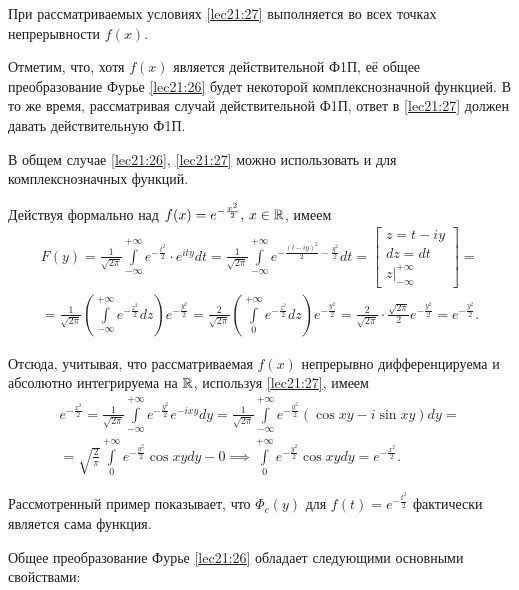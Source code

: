 \documentclass[../../main.tex]{subfiles}
\newcommand{\intii}{\int\limits_{-\infty}^{+\infty}}
\begin{document}
При  рассматриваемых условиях \eqref{lec21:27} выполняется во всех точках 
непрерывности $f(x)$.

Отметим, что, хотя $f(x)$ является действительной Ф1П, её общее преобразование 
Фурье \eqref{lec21:26} будет некоторой комплекснозначной функцией. В то же 
время, рассматривая случай действительной Ф1П, ответ в \eqref{lec21:27} 
должен давать действительную Ф1П.

В общем случае \eqref{lec21:26}, \eqref{lec21:27} можно использовать и для  
комплекснозначных функций.

\begin{example}
  Действуя формально над  $f(x) = e^{-\frac{x^2}2}, \, x \in \mathbb{R}$, имеем
  \begin{multline*}
    F(y) = \frac1{\sqrt{2\pi}}\intii e^{-\frac{t^2}2} \cdot e^{ity} dt = 
    \frac1{\sqrt{2\pi}}\intii e^{-\frac{(t-iy)^2}2-\frac{y^2}2} dt =
    \begin{bmatrix}
      z = t-iy \\
      dz = dt \\
      z \big|_{-\infty}^{+\infty}
    \end{bmatrix} =\\ =
    \frac1{\sqrt{2\pi}} \left(\intii e^{-\frac{z^2}2} dz\right)
    e^{-\frac{y^2}2} = \frac{2}{\sqrt{2\pi}}\left(\int\limits_{0}^{+\infty} 
    e^{-\frac{z^2}2} dz\right) e^{-\frac{y^2}2} = \frac{2}{\sqrt{2\pi}}\cdot
    \frac{\sqrt{2\pi}}{2}e^{-\frac{y^2}2} =  e^{-\frac{y^2}2}.
  \end{multline*}
  
  Отсюда, учитывая, что рассматриваемая $f(x)$ непрерывно дифференцируема и 
  абсолютно интегрируема на $\mathbb{R}$, используя \eqref{lec21:27}, имеем
  \begin{multline*}
    e^{-\frac{x^2}2} = \frac{1}{\sqrt{2\pi}}\intii e^{-\frac{y^2}2}e^{-ixy} dy 
    =\frac{1}{\sqrt{2\pi}}\intii e^{-\frac{y^2}2}(\cos xy - i\sin xy) dy =\\= 
    \sqrt{\frac{2}{\pi}}\int\limits_{0}^{+\infty} e^{-\frac{y^2}2}\cos xy dy - 
    0 \implies \int\limits_{0}^{+\infty} e^{-\frac{y^2}2}\cos xy dy = 
    e^{-\frac{x^2}2}.
  \end{multline*}
\end{example}

Рассмотренный пример показывает, что $\Phi_c(y)$ для $f(t) = e^{-\frac{t^2}2}$ 
фактически является сама функция.

Общее преобразование Фурье \eqref{lec21:26} обладает следующими основными
свойствами:
\end{document}
